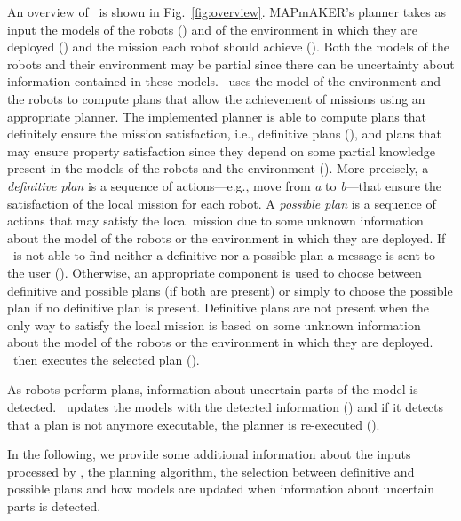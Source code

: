 
An overview of \toolName\ is shown in Fig.~\ref{fig:overview}.
MAPmAKER's planner takes as input the models of the robots () and of the environment in which they are deployed () and the mission each robot should achieve ().
Both the models of the robots and their environment may be partial since there can be uncertainty about information contained in these models.
\toolName\ uses the model of the environment and the robots to compute plans that allow the achievement of missions using an appropriate planner.
The implemented planner is able to compute plans that definitely ensure the mission satisfaction, i.e., definitive plans  (), and plans that may ensure property satisfaction since they depend on some partial knowledge present in the models of the robots and the environment  ().
More precisely, a \emph{definitive plan} is a sequence of actions---e.g., move from \emph{a} to \emph{b}---that ensure the satisfaction of the local mission for each robot. 
A \emph{possible plan} is a sequence of actions that may satisfy the local mission due to some unknown information about the model of the robots or the environment in which they are deployed. 
If \toolName\ is not able to find neither a definitive nor a possible plan a message is sent to the user ().
Otherwise, an appropriate component is used to choose between definitive and possible plans (if both are present) or simply to choose the possible plan if no definitive plan is present.
Definitive plans are not present when the only way to satisfy the local mission is based on some unknown information about the model of the robots or the environment in which they are deployed. 
\toolName\ then executes the selected plan ().

As robots perform plans, information about uncertain parts of the model is detected.
\toolName\ updates the  models with the detected information () and if it detects that a plan is not anymore executable, the planner is re-executed ().


In the following, we provide some additional information about the inputs processed  by \toolName, the planning algorithm, the selection between definitive and possible plans and how models are updated when information about uncertain parts is detected.


